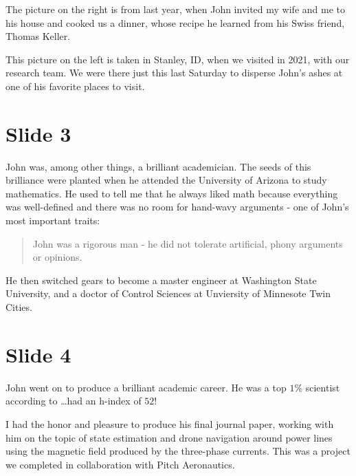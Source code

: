 \documentclass[journal,twoside,web]{ieeecolor}
\begin{document}
The picture on the right is from last year, when John invited my wife and me to 
his house and cooked us a dinner, whose recipe he learned from his Swiss friend,
Thomas Keller.

This picture on the left is taken in Stanley, ID, when we visited in 2021, with 
our research team. We were there just this last Saturday to disperse John's 
ashes at one of his favorite places to visit.

\section{Slide 3}

John was, among other things, a brilliant academician. The seeds of this brilliance were planted when he attended the University of Arizona to study 
mathematics. He used to tell me that he always liked math because everything was
well-defined and there was no room for hand-wavy arguments - one of John's most
important traits:

\begin{quote}
John was a rigorous man - he did not tolerate artificial, phony arguments or
opinions.
\end{quote}

He then switched gears to become a master engineer at Washington State
University, and a doctor of Control Sciences at Unviersity of Minnesote Twin
Cities.

\section{Slide 4}

John went on to produce a brilliant academic career. He was a top $1\%$ scientist according to \ldots had an h-index of $52$!

I had the honor and pleasure to produce his final journal paper, working with
him on the topic of state estimation and drone navigation around power lines
using the magnetic field produced by the three-phase currents. This was a
project we completed in collaboration with Pitch Aeronautics.

  
% 

% 
\end{document}

